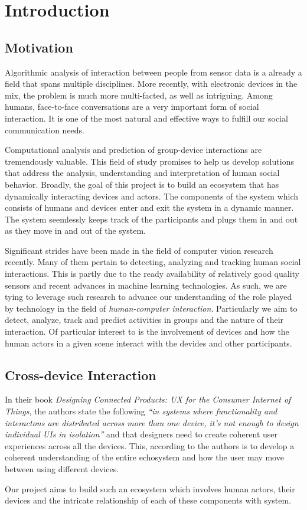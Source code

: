 \section{Introduction}

\subsection{Motivation}
Algorithmic analysis of interaction between people from sensor data
is a already a field that spans multiple disciplines. More recently,
with electronic devices in the mix, the problem is much more
multi-facted, as well as intriguing. Among humans, face-to-face
conversations are a very important form of social interaction. It is
one of the most natural and effective ways to fulfill our social
communication needs.

Computational analysis and prediction of group-device interactions are
tremendously valuable. This field of study promises to help us develop
solutions that address the analysis, understanding and interpretation
of human social behavior. Broadly, the goal of this project is to
build an ecosystem that has dynamically interacting devices and
actors. The components of the system which consists of humans and
devices enter and exit the system in a dynamic manner. The system
seemlessly keeps track of the participants and plugs them in and out
as they move in and out of the system.

Significant strides have been made in the field of computer vision
research recently. Many of them pertain to detecting, analyzing and
tracking human social interactions. This is partly due to the ready
availability of relatively good quality sensors and recent advances in
machine learning technologies. As such, we are tying to leverage such
research to advance our understanding of the role played by technology
in the field of \emph{human-computer interaction}. Particularly we aim
to detect, analyze, track and predict activities in groups and the
nature of their interaction. Of particular interest to is the
involvement of devices and how the human actors in a given scene
interact with the devides and other participants.

\subsection{Cross-device Interaction}
In their book \emph{Designing Connected Products: UX for the Consumer
  Internet of Things}, the authors state the following \emph{``in
  systems where functionality and interactons are distributed across
  more than one device, it's not enough to design individual UIs in
  isolation''} and that designers need to create coherent user
experiences across all the devices. This, according to the authors is
to develop a coherent understanding of the entire echosystem and how
the user may move between using different devices.

Our project aims to build such an ecosystem which involves human
actors, their devices and the intricate relationship of each of these
components with system.


